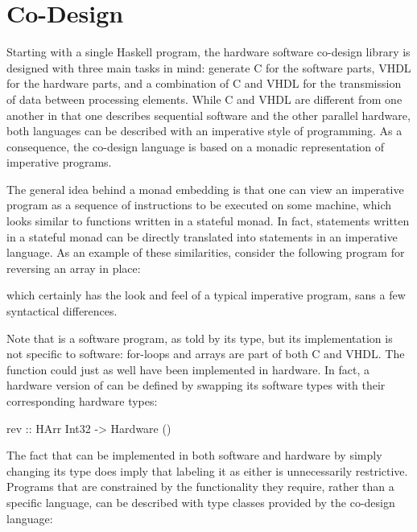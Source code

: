 \documentclass[../paper.tex]{subfiles}
\begin{document}
\chapter{Co-Design}
\label{codesign}

Starting with a single Haskell program, the hardware software co-design library is designed with three main tasks in mind: generate C for the software parts, VHDL for the hardware parts, and a combination of C and VHDL for the transmission of data between processing elements. While C and VHDL are different from one another in that one describes sequential software and the other parallel hardware, both languages can be described with an imperative style of programming. As a consequence, the co-design language is based on a monadic representation of imperative programs.

The general idea behind a monad embedding is that one can view an imperative program as a sequence of instructions to be executed on some machine, which looks similar to functions written in a stateful monad. In fact, statements written in a stateful monad can be directly translated into statements in an imperative language. As an example of these similarities, consider the following program for reversing an array in place:


\noindent which certainly has the look and feel of a typical imperative program, sans a few syntactical differences. 

Note that  is a software program, as told by its type, but its implementation is not specific to software: for-loops and arrays are part of both C and VHDL. The function could just as well have been implemented in hardware. In fact, a hardware version of  can be defined by swapping its software types with their corresponding hardware types:

\begin{code}
rev :: HArr Int32 -> Hardware ()
\end{code}

The fact that  can be implemented in both software and hardware by simply changing its type does imply that labeling it as either is unnecessarily restrictive. Programs that are constrained by the functionality they require, rather than a specific language, can be described with type classes provided by the co-design language:
\end{document}
